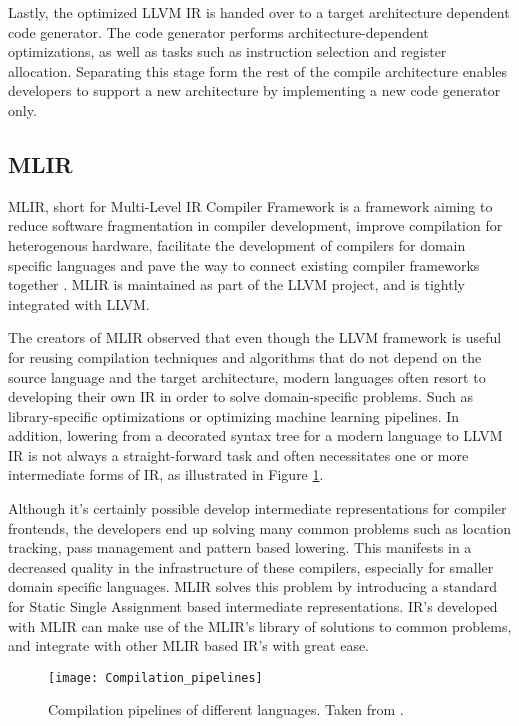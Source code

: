Lastly, the optimized LLVM IR is handed over to a target architecture dependent code generator.
The code generator performs architecture-dependent optimizations, as well as tasks such as instruction selection and register allocation.
Separating this stage form the rest of the compile architecture enables developers to support a new architecture by implementing a new code generator only.

\subsection{MLIR}
MLIR, short for Multi-Level IR Compiler Framework is a framework aiming to reduce software fragmentation in compiler development, improve compilation for heterogenous hardware, facilitate the development of compilers for domain specific languages and pave the way to connect existing compiler frameworks together \cite{MLIR}.
MLIR is maintained as part of the LLVM project, and is tightly integrated with LLVM.

The creators of MLIR observed that even though the LLVM framework is useful for reusing compilation techniques and algorithms that do not depend on
the source language and the target architecture, modern languages often resort to developing their own IR in order to solve domain-specific problems.
Such as library-specific optimizations or optimizing machine learning pipelines.
In addition, lowering from a decorated syntax tree for a modern language to LLVM IR is not always a straight-forward task and often necessitates one or more intermediate forms of IR, as illustrated in Figure \ref{compilationPipelines}.

Although it's certainly possible develop intermediate representations for compiler frontends, the developers end up solving many common problems such as 
location tracking, pass management and pattern based lowering.
This manifests in a decreased quality in the infrastructure of these compilers, especially for smaller domain specific languages.
MLIR solves this problem by introducing a standard for Static Single Assignment based intermediate representations.
IR's developed with MLIR can make use of the MLIR's library of solutions to common problems, and integrate with other MLIR based IR's with great ease.

\begin{figure}[h]
    \centering
    \texttt{[image: Compilation\_pipelines]}
    \caption{Compilation pipelines of different languages. Taken from \cite{MLIR2020}.}
    \label{compilationPipelines}
\end{figure}

